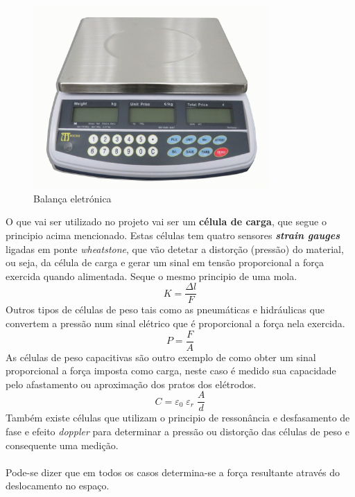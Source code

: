 \\
\begin{figure}[H]
	\centering
	\includegraphics[height=7cm]{./image/PESTA/general/Scale_1.jpg}
	\caption{Balança eletrónica}
	\label{Scale_1}
\end{figure}
O que vai ser utilizado no projeto vai ser um \textbf{célula de carga}, que segue o principio acima mencionado. Estas células tem quatro sensores \textit{\textbf{strain gauges}} ligadas em ponte \textit{wheatstone}, que vão detetar a distorção (pressão) do material, ou seja, da célula de carga e gerar um sinal em tensão proporcional a força exercida quando alimentada. Seque o mesmo principio de uma mola.
\begin{equation}
	\label{eq:Hooke}
	K = \frac{\Delta l}{F}
\end{equation}
Outros tipos de células de peso tais como as pneumáticas e hidráulicas que convertem a pressão num sinal elétrico que é proporcional a força nela exercida.
\begin{equation}
	\label{eq:Preasure}
	P = \frac{F}{A}
\end{equation}
As células de peso capacitivas são outro exemplo de como obter um sinal proporcional a força imposta como carga, neste caso é medido sua capacidade pelo afastamento ou aproximação dos pratos dos elétrodos.
\begin{equation}
	\label{eq:Capacity}
	C = \varepsilon_{0} \; \varepsilon_{r} \; \frac{A}{d}
\end{equation}
Também existe células que utilizam o principio de ressonância e desfasamento de fase e efeito \textit{doppler} para determinar a pressão ou distorção das células de peso e consequente uma medição.
\\
\\
Pode-se dizer que em todos os casos determina-se a força resultante através do deslocamento no espaço.
